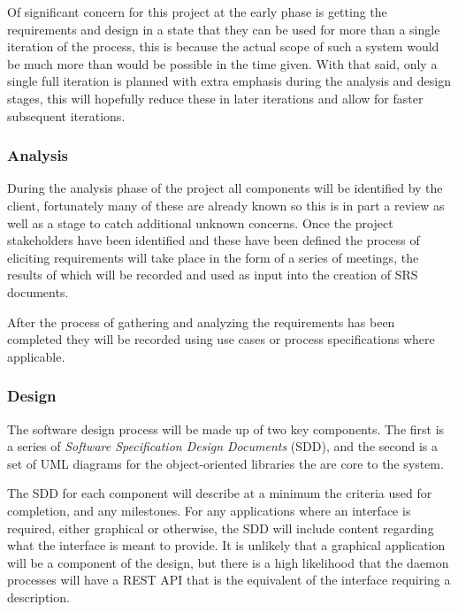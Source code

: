 \documentclass[11pt]{article}
\begin{document}
      Of significant concern for this project at the early phase is getting the
      requirements and design in a state that they can be used for more than a
      single iteration of the process, this is because the actual scope of such
      a system would be much more than would be possible in the time given.
      With that said, only a single full iteration is planned with extra
      emphasis during the analysis and design stages, this will hopefully
      reduce these in later iterations and allow for faster subsequent
      iterations.

      \subsubsection{Analysis}\label{sec:soln-model-analysis}

        During the analysis phase of the project all components will be
        identified by the client, fortunately many of these are already known
        so this is in part a review as well as a stage to catch additional unknown
        concerns. Once the project stakeholders have been identified and these
        have been defined the process of eliciting requirements will take place
        in the form of a series of meetings, the results of which will be
        recorded and used as input into the creation of SRS documents.

        After the process of gathering and analyzing the requirements has been
        completed they will be recorded using use cases or process
        specifications where applicable.

      \subsubsection{Design}\label{sec:soln-model-design}

        The software design process will be made up of two key components. The
        first is a series of \emph{Software Specification Design Documents}
        (SDD), and the second is a set of UML diagrams for the object-oriented
        libraries the are core to the system.

        The SDD for each component will describe at a minimum the criteria used
        for completion, and any milestones. For any applications where an
        interface is required, either graphical or otherwise, the SDD will
        include content regarding what the interface is meant to provide. It is
        unlikely that a graphical application will be a component of the design,
        but there is a high likelihood that the daemon processes will have a
        REST API that is the equivalent of the interface requiring a
        description.
\end{document}
